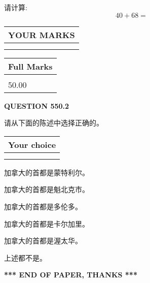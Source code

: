 \documentclass{ctexart}
\begin{document}
  
 
请计算:
\begin{equation}
40 +  %
68 = \nonumber
\end{equation}
 

 

 
  
\vspace{0.2in}
  
\noindent\begin{tabular}{|l|}
\hline
 YOUR MARKS  \\
\hline
 \\ 
 \\ 
\hline
\end{tabular}
\hspace{0.05in} \begin{tabular}{|l|}
\hline
 Full Marks  \\
\hline
 \\ 
50.00 \\
\hline
\end{tabular}
{\textbf{\Large{QUESTION
550.2 
}}}
  
  
请从下面的陈述中选择正确的。
  
  
\noindent\hspace{3.0in} \begin{tabular}{|l|}
\hline
Your choice \\
\hline
 \\ 
 \\ 
\hline
\end{tabular}
  
  
 
 
加拿大的首都是蒙特利尔。
 
 
加拿大的首都是魁北克市。
 
 
加拿大的首都是多伦多。
 
 
加拿大的首都是卡尔加里。
 
 
加拿大的首都是渥太华。
 
 
 上述都不是。
 
 
   
   
 \vspace{0.2in}
 
   
   
   
   
\vspace{1.0in} 
{\textbf{\large{ *** END OF PAPER, THANKS *** }}} 
   
\end{document}
